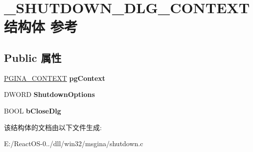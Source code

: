 \hypertarget{struct___s_h_u_t_d_o_w_n___d_l_g___c_o_n_t_e_x_t}{}\section{\+\_\+\+S\+H\+U\+T\+D\+O\+W\+N\+\_\+\+D\+L\+G\+\_\+\+C\+O\+N\+T\+E\+X\+T结构体 参考}
\label{struct___s_h_u_t_d_o_w_n___d_l_g___c_o_n_t_e_x_t}
\subsection*{Public 属性}
\begin{DoxyCompactItemize}
\item 
\mbox{\label{struct___s_h_u_t_d_o_w_n___d_l_g___c_o_n_t_e_x_t_a411fc10b9913611b369af24aa61d609e}} 
\hyperlink{struct_g_i_n_a___c_o_n_t_e_x_t}{P\+G\+I\+N\+A\+\_\+\+C\+O\+N\+T\+E\+XT} {\bfseries pg\+Context}
\item 
\mbox{\label{struct___s_h_u_t_d_o_w_n___d_l_g___c_o_n_t_e_x_t_a8888fd8365c13b0b06e5fff6bac0a018}} 
D\+W\+O\+RD {\bfseries Shutdown\+Options}
\item 
\mbox{\label{struct___s_h_u_t_d_o_w_n___d_l_g___c_o_n_t_e_x_t_a75df2052ed522e7dbfa82f2b59fa6cca}} 
B\+O\+OL {\bfseries b\+Close\+Dlg}
\end{DoxyCompactItemize}


该结构体的文档由以下文件生成\+:\begin{DoxyCompactItemize}
\item 
E\+:/\+React\+O\+S-\/0../dll/win32/msgina/shutdown.\+c\end{DoxyCompactItemize}
